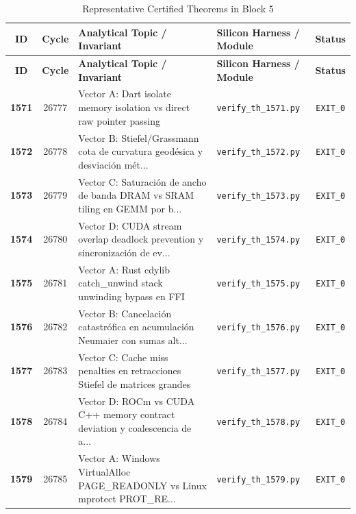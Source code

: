 \documentclass[journal,10pt,compsoc]{IEEEtran}
\theoremstyle{plain}
\theoremstyle{definition}
\begin{document}
\begin{center}
\small
\begin{longtable}{ccp{6.8cm}p{5.2cm}c}
\caption{Representative Certified Theorems in Block 5} \label{tab:theorems_block_5} \\
\toprule
\textbf{ID} & \textbf{Cycle} & \textbf{Analytical Topic / Invariant} & \textbf{Silicon Harness / Module} & \textbf{Status} \\
\midrule
\endfirsthead
\toprule
\textbf{ID} & \textbf{Cycle} & \textbf{Analytical Topic / Invariant} & \textbf{Silicon Harness / Module} & \textbf{Status} \\
\midrule
\endhead
\bottomrule
\endfoot
\textbf{1571} & 26777 & Vector A: Dart isolate memory isolation vs direct raw pointer passing \label{thm:polydim_1571} & \texttt{verify\_th\_1571.py} & \texttt{EXIT\_0} \\
\textbf{1572} & 26778 & Vector B: Stiefel/Grassmann cota de curvatura geodésica y desviación mét... \label{thm:polydim_1572} & \texttt{verify\_th\_1572.py} & \texttt{EXIT\_0} \\
\textbf{1573} & 26779 & Vector C: Saturación de ancho de banda DRAM vs SRAM tiling en GEMM por b... \label{thm:polydim_1573} & \texttt{verify\_th\_1573.py} & \texttt{EXIT\_0} \\
\textbf{1574} & 26780 & Vector D: CUDA stream overlap deadlock prevention y sincronización de ev... \label{thm:polydim_1574} & \texttt{verify\_th\_1574.py} & \texttt{EXIT\_0} \\
\textbf{1575} & 26781 & Vector A: Rust cdylib catch\_unwind stack unwinding bypass en FFI \label{thm:polydim_1575} & \texttt{verify\_th\_1575.py} & \texttt{EXIT\_0} \\
\textbf{1576} & 26782 & Vector B: Cancelación catastrófica en acumulación Neumaier con sumas alt... \label{thm:polydim_1576} & \texttt{verify\_th\_1576.py} & \texttt{EXIT\_0} \\
\textbf{1577} & 26783 & Vector C: Cache miss penalties en retracciones Stiefel de matrices grandes \label{thm:polydim_1577} & \texttt{verify\_th\_1577.py} & \texttt{EXIT\_0} \\
\textbf{1578} & 26784 & Vector D: ROCm vs CUDA C++ memory contract deviation y coalescencia de a... \label{thm:polydim_1578} & \texttt{verify\_th\_1578.py} & \texttt{EXIT\_0} \\
\textbf{1579} & 26785 & Vector A: Windows VirtualAlloc PAGE\_READONLY vs Linux mprotect PROT\_RE... \label{thm:polydim_1579} & \texttt{verify\_th\_1579.py} & \texttt{EXIT\_0} \\

\end{longtable}
\end{center}
\end{document}
